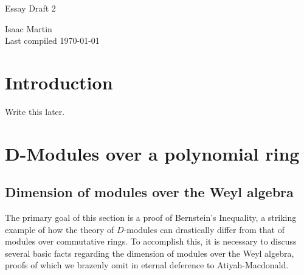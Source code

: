 


\begin{center}
	\Large
	\begin{LARGE}
		Essay Draft 2 \\
	\end{LARGE}
	Isaac Martin \\
    Last compiled \today
\end{center}
\normalsize
\vspace{-2mm}
\hru

\tableofcontents
\newpage
\section*{Introduction}
Write this later.

\newpage
\section{D-Modules over a polynomial ring}

\subsection{Dimension of modules over the Weyl algebra}
The primary goal of this section is a proof of Bernstein's Inequality, a striking example of how the theory of $D$-modules can drastically differ from that of modules over commutative rings. To accomplish this, it is necessary to discuss several basic facts regarding the dimension of modules over the Weyl algebra, proofs of which we brazenly omit in eternal deference to Atiyah-Macdonald.
